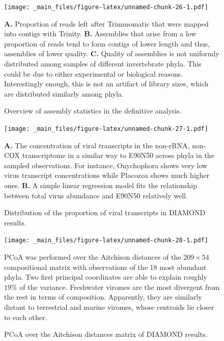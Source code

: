 \documentclass[
  openany]{book}
\begin{document}
\begin{figure}[!htbp]

\texttt{[image: \_main\_files/figure-latex/unnamed-chunk-26-1.pdf]}

\caption{Overview of assembly statistics in the definitive analysis.\label{fig:assemblystats}}
\textbf{A.} Proportion of reads left after Trimmomatic that were mapped into contigs with Trinity. \textbf{B.} Assemblies that arise from a low proportion of reads tend to form contigs of lower length and thus, assemblies of lower quality. \textbf{C.} Quality of assemblies is not uniformly distributed among samples of different invertebrate phyla. This could be due to either experimental or biological reasons. Interestingly enough, this is not an artifact of library sizes, which are distributed similarly among phyla.
\end{figure}

\begin{figure}[!htbp]

\texttt{[image: \_main\_files/figure-latex/unnamed-chunk-27-1.pdf]}

\caption{Distribution of the proportion of viral transcripts in DIAMOND results.\label{fig:virqual}}
\textbf{A.} The concentration of viral transcripts in the non-rRNA, non-COX transcriptome in a similar way to E90N50 across phyla in the sampled observations. For instance, Onychophora shows very low virus transcript concentrations while Placozoa shows much higher ones. \textbf{B.} A simple linear regression model fits the relationship between total virus abundance and E90N50 relatively well.


\end{figure}

\begin{figure}[!htbp]

\texttt{[image: \_main\_files/figure-latex/unnamed-chunk-28-1.pdf]}

\caption{PCoA over the Aitchison distances matrix of DIAMOND results.\label{fig:habpcoa}}
PCoA was performed over the Aitchison distances of the $209\times54$ compositional matrix with observations of the 18 most abundant phyla. Two first principal coordinates are able to explain roughly $19\%$ of the variance. Freshwater viromes are the most divergent from the rest in terms of composition. Apparently, they are similarly distant to terrestrial and marine viromes, whose centroids lie closer to each other.

\end{figure}
\end{document}
